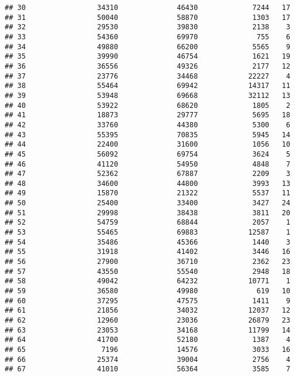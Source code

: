 \documentclass[
]{article}
\begin{document}
\begin{verbatim}
## 30                 34310              46430             7244   17
## 31                 50040              58870             1303   17
## 32                 29530              39830             2138    3
## 33                 54360              69970              755    6
## 34                 49880              66200             5565    9
## 35                 39990              46754             1621   19
## 36                 36556              49326             2177   12
## 37                 23776              34468            22227    4
## 38                 55464              69942            14317   11
## 39                 53948              69668            32112   13
## 40                 53922              68620             1805    2
## 41                 18873              29777             5695   18
## 42                 33760              44380             5300    6
## 43                 55395              70835             5945   14
## 44                 22400              31600             1056   10
## 45                 56092              69754             3624    5
## 46                 41120              54950             4848    7
## 47                 52362              67887             2209    3
## 48                 34600              44800             3993   13
## 49                 15870              21322             5537   11
## 50                 25400              33400             3427   24
## 51                 29998              38438             3811   20
## 52                 54759              68844             2057    1
## 53                 55465              69883            12587    1
## 54                 35486              45366             1440    3
## 55                 31918              41402             3446   16
## 56                 27900              36710             2362   23
## 57                 43550              55540             2948   18
## 58                 49042              64232            10771    1
## 59                 36580              49980              619   10
## 60                 37295              47575             1411    9
## 61                 21856              34032            12037   12
## 62                 12960              23036            26879   23
## 63                 23053              34168            11799   14
## 64                 41700              52180             1387    4
## 65                  7196              14576             3033   16
## 66                 25374              39004             2756    4
## 67                 41010              56364             3585    7

\end{verbatim}
\end{document}
